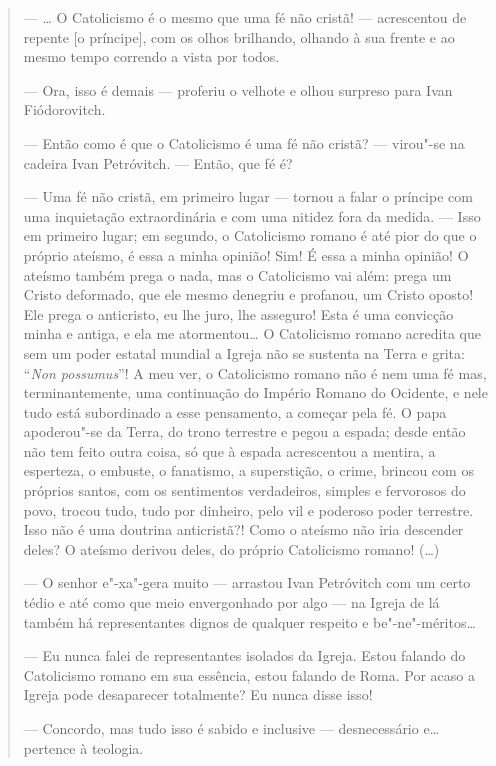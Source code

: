 \begin{quotation}
--- \ldots{} O Catolicismo é o mesmo que uma fé não cristã! --- acrescentou de repente [o príncipe], com os olhos brilhando,
olhando à sua frente e ao mesmo tempo correndo a vista por todos.

--- Ora, isso é demais --- proferiu o velhote e olhou surpreso para Ivan Fiódorovitch.

--- Então como é que o Catolicismo é uma fé não cristã? --- virou"-se na cadeira Ivan Petróvitch. --- Então, que fé é?

--- Uma fé não cristã, em primeiro lugar --- tornou a falar o príncipe com uma inquietação extraordinária e com uma nitidez fora da medida. --- Isso em primeiro lugar; em segundo, o Catolicismo romano é até pior do que o próprio ateísmo, é essa a minha opinião! Sim! É essa a minha opinião! O ateísmo também prega o nada, mas o Catolicismo vai além: prega um Cristo deformado, que ele mesmo denegriu e profanou, um Cristo oposto! Ele prega o anticristo, eu lhe juro, lhe asseguro! Esta é uma convicção minha e antiga, e ela me atormentou\ldots{} O Catolicismo romano acredita que sem um poder estatal mundial a Igreja não se sustenta na
Terra e grita: ``\emph{Non possumus}''! A meu ver, o Catolicismo romano não é nem uma fé mas, terminantemente, uma continuação do Império Romano do Ocidente, e nele tudo está subordinado a esse pensamento, a começar pela fé. O papa apoderou"-se da Terra, do trono terrestre e pegou a espada; desde então não tem feito outra coisa, só que à espada acrescentou a mentira, a esperteza, o embuste, o fanatismo, a superstição, o crime, brincou com os próprios santos, com os sentimentos verdadeiros, simples
e fervorosos do povo, trocou tudo, tudo por dinheiro, pelo vil e poderoso poder terrestre. Isso não é uma doutrina anticristã?! Como o ateísmo não iria descender deles? O ateísmo derivou deles, do próprio Catolicismo romano! (\ldots{})

--- O senhor e"-xa"-gera muito --- arrastou Ivan Petróvitch com um certo tédio e até como que meio envergonhado por algo --- na Igreja de lá também há representantes dignos de qualquer respeito e be"-ne"-méritos\ldots{}

--- Eu nunca falei de representantes isolados da Igreja. Estou falando do Catolicismo romano em sua essência, estou falando de Roma. Por acaso a Igreja pode desaparecer totalmente? Eu nunca disse isso!

--- Concordo, mas tudo isso é sabido e inclusive --- desnecessário e\ldots{} pertence à teologia.


\end{quotation}
